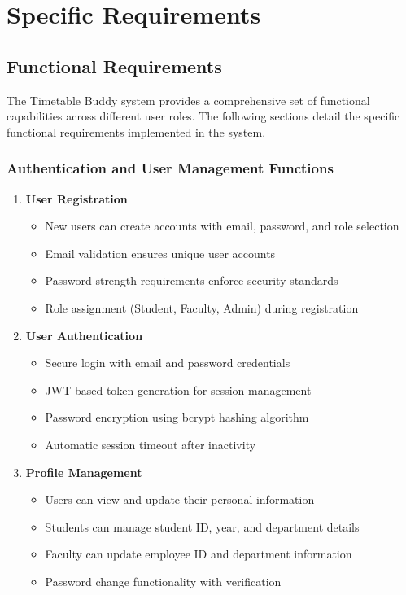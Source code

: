 \chapter{Specific Requirements}

\section{Functional Requirements}

The Timetable Buddy system provides a comprehensive set of functional capabilities across different user roles. The following sections detail the specific functional requirements implemented in the system.

\subsection{Authentication and User Management Functions}

\begin{enumerate}[leftmargin=*]
    \item \textbf{User Registration}
    \begin{itemize}
        \item New users can create accounts with email, password, and role selection
        \item Email validation ensures unique user accounts
        \item Password strength requirements enforce security standards
        \item Role assignment (Student, Faculty, Admin) during registration
    \end{itemize}
    
    \item \textbf{User Authentication}
    \begin{itemize}
        \item Secure login with email and password credentials
        \item JWT-based token generation for session management
        \item Password encryption using bcrypt hashing algorithm
        \item Automatic session timeout after inactivity
    \end{itemize}
    
    \item \textbf{Profile Management}
    \begin{itemize}
        \item Users can view and update their personal information
        \item Students can manage student ID, year, and department details
        \item Faculty can update employee ID and department information
        \item Password change functionality with verification
    \end{itemize}
\end{enumerate}

